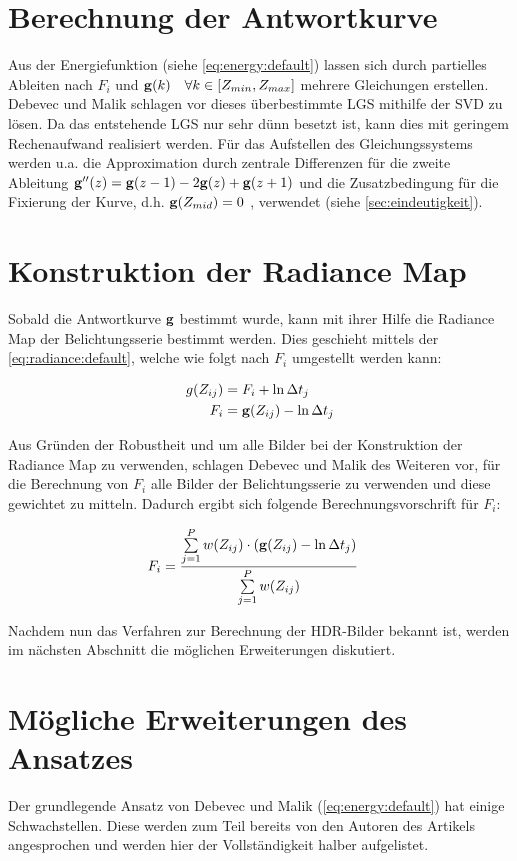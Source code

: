 \section{Berechnung der Antwortkurve}
Aus der Energiefunktion (siehe \autoref{eq:energy:default}) lassen sich durch partielles Ableiten nach $F_i$ und $\mathbf g(k) \quad \forall k \in [Z_{min}, Z_{max}]$ mehrere Gleichungen erstellen. Debevec und Malik schlagen vor dieses überbestimmte \gls{LGS} mithilfe der \gls{SVD} zu lösen. Da das entstehende \gls{LGS} nur sehr dünn besetzt ist, kann dies mit geringem Rechenaufwand realisiert werden. Für das Aufstellen des Gleichungssystems werden u.a. die Approximation durch zentrale Differenzen für die zweite Ableitung $\mathbf{g}''(z) = \mathbf g(z-1)-2\mathbf g(z)+\mathbf g(z+1)$ und die Zusatzbedingung für die Fixierung der Kurve, d.h. $\mathbf g(Z_{mid}) = 0$ , verwendet (siehe \autoref{sec:eindeutigkeit}).


\section{Konstruktion der Radiance Map}
\label{sec:algo:radiance}
Sobald die Antwortkurve $\mathbf g$ bestimmt wurde, kann mit ihrer Hilfe die \gls{Radiance Map} der Belichtungsserie bestimmt werden. Dies geschieht mittels der \autoref{eq:radiance:default}, welche wie folgt nach $F_i$ umgestellt werden kann: 

\begin{align}
\label{eq:radiance:default}
g(Z_{ij}) &= F_i + \ln \Delta t_j\\
F_i &= \mathbf g(Z_{ij})-\ln \Delta t_j
\end{align}

Aus Gründen der Robustheit und um alle Bilder bei der Konstruktion der \gls{Radiance Map} zu verwenden, schlagen Debevec und Malik des Weiteren vor, für die Berechnung von $F_i$ alle Bilder der Belichtungsserie zu verwenden und diese gewichtet zu mitteln. Dadurch ergibt sich folgende Berechnungsvorschrift für $F_i$: 


\begin{align}
\label{eq:radiance:weight}
F_i &= \frac{\sum \limits_{j=1}^P w(Z_{ij}) \cdot (\mathbf g(Z_{ij})-\ln \Delta t_j)}{\sum \limits_{j=1}^P w(Z_{ij})}
\end{align}

Nachdem nun das Verfahren zur Berechnung der \gls{HDR}-Bilder bekannt ist, werden im nächsten Abschnitt die möglichen Erweiterungen diskutiert.

\section{Mögliche Erweiterungen des Ansatzes}
\label{algo:schwachstellen}
Der grundlegende Ansatz von Debevec und Malik (\autoref{eq:energy:default}) hat einige Schwachstellen. Diese werden zum Teil bereits von den Autoren des Artikels angesprochen und werden hier der Vollständigkeit halber aufgelistet.

